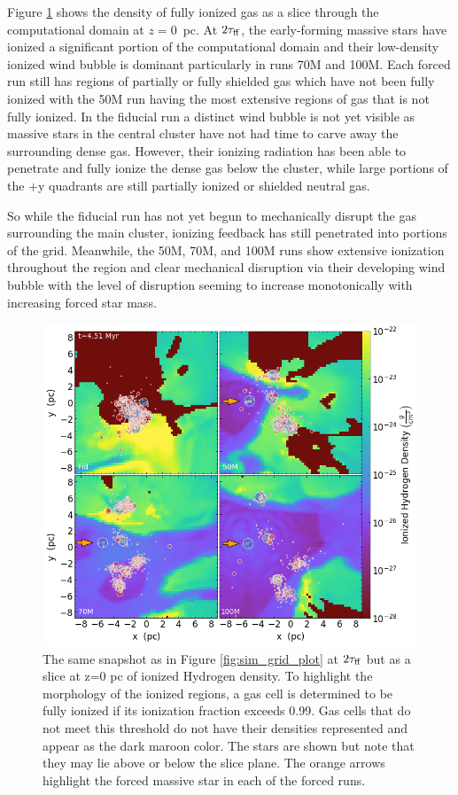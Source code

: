 \documentclass[twoside]{drexel-thesis}
\begin{document}
\begin{thesis}
Figure \ref{fig:sim_grid_plot_Hatom} 
shows the density of fully ionized gas as a slice through the computational domain at $z=0$~pc. 
At $2\tau_{\rm ff}$, the early-forming massive stars have ionized a significant portion of the computational domain and their low-density ionized wind bubble is dominant particularly in runs 70M and 100M. Each forced run still has regions of partially or fully shielded gas which have not been fully ionized with the 50M run having the most extensive regions of gas that is not fully ionized.
In the fiducial run a distinct wind bubble is not yet visible as massive stars in the central cluster have not had time to carve away the surrounding dense gas. However, their ionizing radiation has been able to penetrate and fully ionize the dense gas below the cluster, while large portions of the +y quadrants are still partially ionized or shielded neutral gas.

So while the fiducial run has not yet begun to mechanically disrupt the gas surrounding the main cluster, ionizing feedback has still penetrated into portions of the grid. Meanwhile, the 50M, 70M, and 100M runs show extensive ionization throughout the region and clear mechanical disruption via their developing wind bubble with the level of disruption seeming to increase monotonically with increasing forced star mass.

\begin{figure}[!htb]
	\centering
	\includegraphics[width=0.8\linewidth]{ionized_H_slice_arrow_092722.png}
    \caption{The same snapshot as in Figure \ref{fig:sim_grid_plot} at $2\tau_{\rm ff}$ but as a slice at z=0 pc of ionized Hydrogen density. To highlight the morphology of the ionized regions, a gas cell is determined to be fully ionized if its ionization fraction exceeds 0.99.  Gas cells that do not meet this threshold do not have their densities represented and appear as the dark maroon color. The stars are shown but note that they may lie above or below the slice plane. The orange arrows highlight the forced massive star in each of the forced runs.}
    \label{fig:sim_grid_plot_Hatom}
\end{figure}


\end{thesis}
\end{document}
